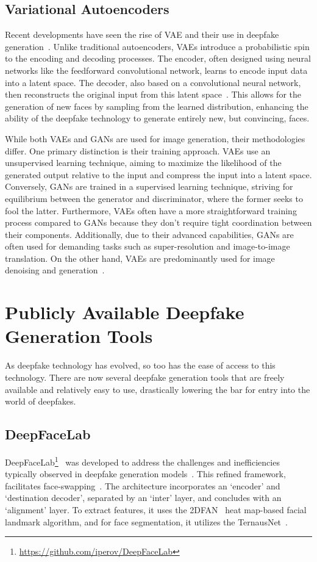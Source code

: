 \subsection{Variational Autoencoders}
Recent developments have seen the rise of \ac{VAE} and their use in deepfake
generation~\cite{kingma2022autoencoding}. Unlike traditional autoencoders, \ac{VAE}s introduce
a probabilistic spin to the encoding and decoding processes. The encoder, often
designed using neural networks like the feedforward convolutional network,
learns to encode input data into a latent space. The decoder, also based
on a convolutional neural network, then reconstructs the original input
from this latent space~\cite{vae-gan}. This allows for the
generation of new faces by sampling from the learned distribution, enhancing the
ability of the deepfake technology to generate entirely new, but convincing, faces.

While both \ac{VAE}s and \ac{GAN}s are used for image generation, their methodologies differ.
One primary distinction is their training approach. \ac{VAE}s use an unsupervised learning
technique, aiming to maximize the likelihood of the generated output relative to the
input and compress the input into a latent space. Conversely, \ac{GAN}s are trained
in a supervised learning technique, striving for equilibrium between the generator
and discriminator, where the former seeks to fool the latter. Furthermore, \ac{VAE}s
often have a more straightforward training process compared to \ac{GAN}s because they
don't require tight coordination between their components. Additionally, due to their
advanced capabilities, \ac{GAN}s are often used for demanding tasks such as
super-resolution and image-to-image translation. On the other hand, \ac{VAE}s are
predominantly used for image denoising and generation~\cite{vae-gan}.

\section{Publicly Available Deepfake Generation Tools}\label{chapter:publicly}
As deepfake technology has evolved, so too has the ease of access to this technology.
There are now several deepfake generation tools that are freely available and relatively
easy to use, drastically lowering the bar for entry into the world of deepfakes.

\subsection{DeepFaceLab}\label{sec:deepfacelab}
DeepFaceLab\footnote{\url{https://github.com/iperov/DeepFaceLab}}~\cite{perov2021deepfacelab,10.1117/12.2631297}
was developed to address the challenges and inefficiencies typically
observed in deepfake generation models~\cite{s22124556}. This refined framework,
facilitates face-swapping~\cite{perov2021deepfacelab}. The architecture incorporates
an `encoder' and `destination decoder', separated by an `inter' layer, and
concludes with an `alignment' layer. To extract features, it uses the 2DFAN~\cite{Bulat_2017}
heat map-based facial landmark algorithm, and for face segmentation,
it utilizes the TernausNet~\cite{iglovikov2018ternausnet}.


